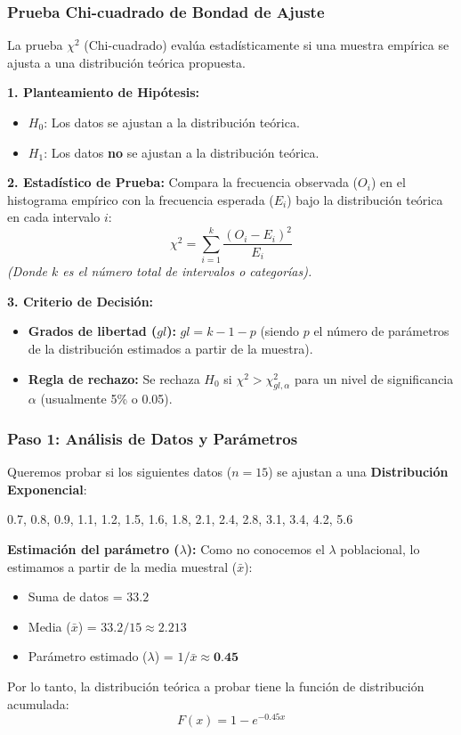 \documentclass[aspectratio=1610, 10pt]{beamer}
\begin{document}
\begin{frame}
\frametitle{Prueba Chi-cuadrado de Bondad de Ajuste}
La prueba $\chi^2$ (Chi-cuadrado) evalúa estadísticamente si una muestra empírica se ajusta a una distribución teórica propuesta.

\vspace{0.2cm}
\textbf{1. Planteamiento de Hipótesis:}
\begin{itemize}
    \item $H_0$: Los datos se ajustan a la distribución teórica.
    \item $H_1$: Los datos \textbf{no} se ajustan a la distribución teórica.
\end{itemize}

\vspace{0.2cm}
\textbf{2. Estadístico de Prueba:}
Compara la frecuencia observada ($O_i$) en el histograma empírico con la frecuencia esperada ($E_i$) bajo la distribución teórica en cada intervalo $i$:
$$\chi^2 = \sum_{i=1}^{k} \frac{(O_i - E_i)^2}{E_i}$$
\textit{(Donde $k$ es el número total de intervalos o categorías).}

\vspace{0.2cm}
\textbf{3. Criterio de Decisión:}
\begin{itemize}
    \item \textbf{Grados de libertad ($gl$):} $gl = k - 1 - p$ (siendo $p$ el número de parámetros de la distribución estimados a partir de la muestra).
    \item \textbf{Regla de rechazo:} Se rechaza $H_0$ si $\chi^2 > \chi^2_{gl, \alpha}$ para un nivel de significancia $\alpha$ (usualmente 5\% o 0.05).
\end{itemize}

\end{frame}


\begin{frame}
\frametitle{Paso 1: Análisis de Datos y Parámetros}
Queremos probar si los siguientes datos ($n=15$) se ajustan a una \textbf{Distribución Exponencial}:
\begin{center}
0.7, 0.8, 0.9, 1.1, 1.2, 1.5, 1.6, 1.8, 2.1, 2.4, 2.8, 3.1, 3.4, 4.2, 5.6
\end{center}

\vspace{0.2cm}
\textbf{Estimación del parámetro ($\lambda$):}
Como no conocemos el $\lambda$ poblacional, lo estimamos a partir de la media muestral ($\bar{x}$):
\begin{itemize}
    \item Suma de datos = $33.2$
    \item Media ($\bar{x}$) = $33.2 / 15 \approx 2.213$
    \item Parámetro estimado ($\lambda$) = $1 / \bar{x} \approx \textbf{0.45}$
\end{itemize}

Por lo tanto, la distribución teórica a probar tiene la función de distribución acumulada: 
$$F(x) = 1 - e^{-0.45x}$$
\end{frame}
\end{document}
